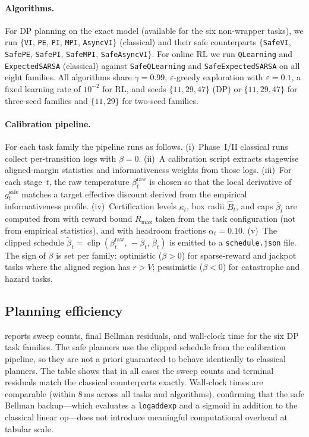 \documentclass{article}
\theoremstyle{remark}
\DeclareMathOperator{\clip}{clip}
\newcommand{\safe}{\mathrm{safe}}
\begin{document}
\paragraph{Algorithms.}
For DP planning on the exact model (available for the six non-wrapper tasks), we run
$\{$\texttt{VI}, \texttt{PE}, \texttt{PI}, \texttt{MPI}, \texttt{AsyncVI}$\}$ (classical) and their safe counterparts
$\{$\texttt{SafeVI}, \texttt{SafePE}, \texttt{SafePI}, \texttt{SafeMPI}, \texttt{SafeAsyncVI}$\}$.
For online RL we run \texttt{QLearning} and \texttt{ExpectedSARSA} (classical) against \texttt{SafeQLearning} and \texttt{SafeExpectedSARSA} on all eight families.
All algorithms share $\gamma=0.99$, $\varepsilon$-greedy exploration with $\varepsilon=0.1$, a fixed learning rate of $10^{-2}$ for RL, and seeds $\{11, 29, 47\}$ (DP) or $\{11, 29, 47\}$ for three-seed families and $\{11, 29\}$ for two-seed families.

\paragraph{Calibration pipeline.}
For each task family the pipeline runs as follows.
(i)~Phase~I/II classical runs collect per-transition logs with $\beta=0$.
(ii)~A calibration script extracts stagewise aligned-margin statistics and informativeness weights from those logs.
(iii)~For each stage~$t$, the raw temperature $\beta_t^{\mathrm{raw}}$ is chosen so that the local derivative of $g_t^{\safe}$ matches a target effective discount derived from the empirical informativeness profile.
(iv)~Certification levels $\kappa_t$, box radii $\hat{B}_t$, and caps $\overline\beta_t$ are computed from  with reward bound $R_{\max}$ taken from the task configuration (not from empirical statistics), and with headroom fractions $\alpha_t=0.10$.
(v)~The clipped schedule $\widetilde\beta_t = \clip(\beta_t^{\mathrm{raw}},\,-\overline\beta_t,\,\overline\beta_t)$ is emitted to a \texttt{schedule.json} file.
The sign of $\beta$ is set per family: optimistic ($\beta>0$) for sparse-reward and jackpot tasks where the aligned region has $r>V$; pessimistic ($\beta<0$) for catastrophe and hazard tasks.

\subsection{Planning efficiency}
\label{sec:exp-dp}

 reports sweep counts, final Bellman residuals, and wall-clock time for the six DP task families.
The safe planners use the clipped schedule from the calibration pipeline, so they are not a priori guaranteed to behave identically to classical planners.
The table shows that in all cases the sweep counts and terminal residuals match the classical counterparts exactly.
Wall-clock times are comparable (within 8\,ms across all tasks and algorithms), confirming that the safe Bellman backup---which evaluates a \texttt{logaddexp} and a sigmoid in addition to the classical linear op---does not introduce meaningful computational overhead at tabular scale.
\end{document}
